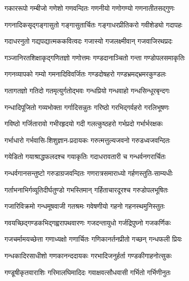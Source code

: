 

\twolineshloka
{गकाररूपो गम्बीजो गणेशो गणवन्दितः}
{गणनीयो गणोगण्यो गणनातीतसद्गुणः}%

\twolineshloka
{गगनादिकसृद्गङ्गासुतो गङ्गासुतार्चितः}
{गङ्गाधरप्रीतिकरो गवीशेड्यो गदापहः}%

\twolineshloka
{गदाधरनुतो गद्यपद्यात्मककवित्वदः}
{गजास्यो गजलक्ष्मीवान् गजवाजिरथप्रदः}%

\twolineshloka
{गञ्जानिरतशिक्षाकृद्गणितज्ञो गणोत्तमः}
{गण्डदानाञ्चितो गन्ता गण्डोपलसमाकृतिः}%

\twolineshloka
{गगनव्यापको गम्यो गमनादिविवर्जितः}
{गण्डदोषहरो गण्डभ्रमद्भ्रमरकुण्डलः}%

\twolineshloka
{गतागतज्ञो गतिदो गतमृत्युर्गतोद्भवः}
{गन्धप्रियो गन्धवाहो गन्धसिन्धूरबृन्दगः}%

\twolineshloka
{गन्धादिपूजितो गव्यभोक्ता गर्गादिसन्नुतः}
{गरिष्ठो गरभिद्गर्वहरो गरलिभूषणः}%

\twolineshloka
{गविष्ठो गर्जितारावो गभीरहृदयो गदी}
{गलत्कुष्ठहरो गर्भप्रदो गर्भार्भरक्षकः}%

\twolineshloka
{गर्भाधारो गर्भवासि-शिशुज्ञान-प्रदायकः}
{गरुत्मत्तुल्यजवनो गरुडध्वजवन्दितः}%

\twolineshloka
{गयेडितो गयाश्राद्धफलदश्च गयाकृतिः}
{गदाधरावतारी च गन्धर्वनगरार्चितः}%

\twolineshloka
{गन्धर्वगानसन्तुष्टो गरुडाग्रजवन्दितः}
{गणरात्रसमाराध्यो गर्हणस्तुति-साम्यधीः}%

\twolineshloka
{गर्ताभनाभिर्गव्यूतिदीर्घतुण्डो गभस्तिमान्}
{गर्हिताचारदूरश्च गरुडोपलभूषितः}%

\twolineshloka
{गजारिविक्रमो गन्धमूषवाजी गतश्रमः}
{गवेषणीयो गहनो गहनस्थमुनिस्तुतः}%

\twolineshloka
{गवयच्छिद्गण्डकभिद्गह्वरापथवारणः}
{गजदन्तायुधो गर्जद्रिपुघ्नो गजकर्णिकः}%

\twolineshloka
{गजचर्मामयच्छेत्ता गणाध्यक्षो गणार्चितः}%
{गणिकानर्तनप्रीतो गच्छन् गन्धफली प्रियः}%

\twolineshloka
{गन्धकादिरसाधीशो गणकानन्ददायकः}%
{गरभादिजनुर्हर्ता गण्डकीगाहनोत्सुकः}%

\twolineshloka
{गण्डूषीकृतवाराशिः गरिमालघिमादिदः}%
{गवाक्षवत्सौधवासी गर्भितो गर्भिणीनुतः}%

